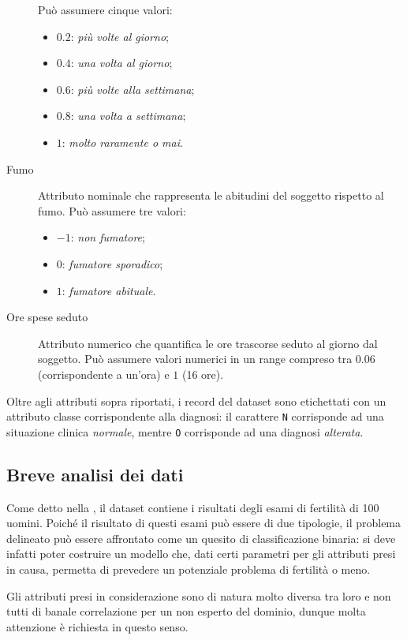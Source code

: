 \begin{description}
    Può assumere cinque valori:
    \begin{itemize}
      \item \(0.2\): \emph{più volte al giorno};
      \item \(0.4\): \emph{una volta al giorno};
      \item \(0.6\): \emph{più volte alla settimana};
      \item \(0.8\): \emph{una volta a settimana};
      \item \(1\): \emph{molto raramente o mai}.
    \end{itemize}
  \item[Fumo]
    Attributo nominale che rappresenta le abitudini del soggetto rispetto al fumo.
    Può assumere tre valori:
    \begin{itemize}
      \item \(-1\): \emph{non fumatore};
      \item \(0\): \emph{fumatore sporadico};
      \item \(1\): \emph{fumatore abituale}.
    \end{itemize}
  \item[Ore spese seduto]
    Attributo numerico che quantifica le ore trascorse seduto al giorno dal soggetto.
    Può assumere valori numerici in un range compreso tra \(0.06\) (corrispondente a un'ora) e \(1\) (16 ore).
  \end{description}

Oltre agli attributi sopra riportati, i record del dataset sono etichettati con un attributo classe corrispondente alla diagnosi:
il carattere \texttt{N} corrisponde ad una situazione clinica \emph{normale}, mentre \texttt{O} corrisponde ad una diagnosi \emph{alterata}.

\subsection{Breve analisi dei dati}\label{subsec:intro:analysis}

Come detto nella , il dataset contiene i risultati degli esami di fertilità di 100 uomini.
Poiché il risultato di questi esami può essere di due tipologie, il problema delineato può essere affrontato come un quesito di classificazione binaria:
si deve infatti poter costruire un modello che, dati certi parametri per gli attributi presi in causa, permetta di prevedere un potenziale problema di fertilità o meno.

Gli attributi presi in considerazione sono di natura molto diversa tra loro e non tutti di banale correlazione per un non esperto del dominio, dunque molta attenzione è richiesta in questo senso.
